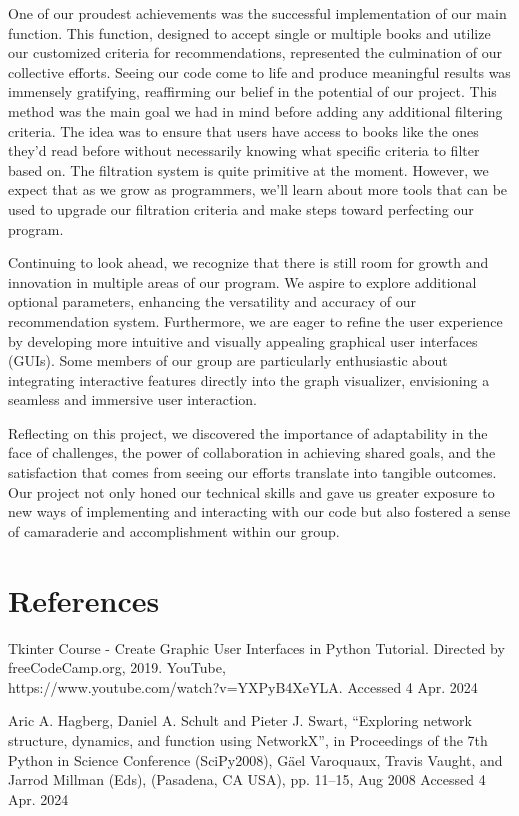 \documentclass{article}
\begin{document}
One of our proudest achievements was the successful implementation of our main function. This function, designed to accept single or multiple books and utilize our customized criteria for recommendations, represented the culmination of our collective efforts. Seeing our code come to life and produce meaningful results was immensely gratifying, reaffirming our belief in the potential of our project. This method was the main goal we had in mind before adding any additional filtering criteria. The idea was to ensure that users have access to books like the ones they'd read before without necessarily knowing what specific criteria to filter based on. The filtration system is quite primitive at the moment. However, we expect that as we grow as programmers, we'll learn about more tools that can be used to upgrade our filtration criteria and make steps toward perfecting our program.

Continuing to look ahead, we recognize that there is still room for growth and innovation in multiple areas of our program. We aspire to explore additional optional parameters, enhancing the versatility and accuracy of our recommendation system. Furthermore, we are eager to refine the user experience by developing more intuitive and visually appealing graphical user interfaces (GUIs). Some members of our group are particularly enthusiastic about integrating interactive features directly into the graph visualizer, envisioning a seamless and immersive user interaction.

Reflecting on this project, we discovered the importance of adaptability in the face of challenges, the power of collaboration in achieving shared goals, and the satisfaction that comes from seeing our efforts translate into tangible outcomes. Our project not only honed our technical skills and gave us greater exposure to new ways of implementing and interacting with our code but also fostered a sense of camaraderie and accomplishment within our group.
\section{References}
Tkinter Course - Create Graphic User Interfaces in Python Tutorial. Directed by 
freeCodeCamp.org, 2019. YouTube,  \\ https://www.youtube.com/watch?v=YXPyB4XeYLA. 
Accessed 4 Apr. 2024

Aric A. Hagberg, Daniel A. Schult and Pieter J. Swart, “Exploring network structure, 
dynamics, and function using NetworkX”, in Proceedings of the 7th Python in Science 
Conference (SciPy2008), Gäel Varoquaux, Travis Vaught, and Jarrod Millman (Eds), 
(Pasadena, CA USA), pp. 11–15, Aug 2008 Accessed 4 Apr. 2024
\end{document}
